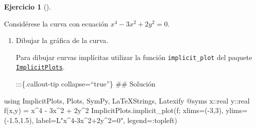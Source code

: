 \documentclass[
  a4paper,
]{scrreport}
\newenvironment{Shaded}{\begin{snugshade}}{\end{snugshade}}
\newcommand{\BuiltInTok}[1]{\textcolor[rgb]{0.00,0.23,0.31}{#1}}
\newcommand{\DataTypeTok}[1]{\textcolor[rgb]{0.68,0.00,0.00}{#1}}
\newcommand{\FloatTok}[1]{\textcolor[rgb]{0.68,0.00,0.00}{#1}}
\newcommand{\FunctionTok}[1]{\textcolor[rgb]{0.28,0.35,0.67}{#1}}
\newcommand{\ImportTok}[1]{\textcolor[rgb]{0.00,0.46,0.62}{#1}}
\newcommand{\NormalTok}[1]{\textcolor[rgb]{0.00,0.23,0.31}{#1}}
\newcommand{\OperatorTok}[1]{\textcolor[rgb]{0.37,0.37,0.37}{#1}}
\newcommand{\PreprocessorTok}[1]{\textcolor[rgb]{0.68,0.00,0.00}{#1}}
\newcommand{\StringTok}[1]{\textcolor[rgb]{0.13,0.47,0.30}{#1}}
\theoremstyle{definition}
\newtheorem{exercise}{Ejercicio}[chapter]
\theoremstyle{remark}
\begin{document}
\begin{exercise}[]\protect\hypertarget{exr-tangente-implicita}{}\label{exr-tangente-implicita}

Considérese la curva con ecuación \(x^4 - 3x^2 + 2y^2=0\).

\begin{enumerate}
\def\labelenumi{\alph{enumi}.}
\item
  Dibujar la gráfica de la curva.

  \begin{tcolorbox}[enhanced jigsaw, left=2mm, toprule=.15mm, toptitle=1mm, colback=white, opacitybacktitle=0.6, arc=.35mm, leftrule=.75mm, colbacktitle=quarto-callout-note-color!10!white, titlerule=0mm, title=\textcolor{quarto-callout-note-color}{\faInfo}\hspace{0.5em}{Ayuda}, bottomrule=.15mm, rightrule=.15mm, breakable, colframe=quarto-callout-note-color-frame, coltitle=black, bottomtitle=1mm, opacityback=0]

  Para dibujar curvas implícitas utilizar la función
  \texttt{implicit\_plot} del paquete
  \href{https://juliapackages.com/p/implicitplots}{\texttt{ImplicitPlots}}.

  \end{tcolorbox}

  :::\{.callout-tip collapse=``true''\} \#\# Solución
\end{enumerate}

\begin{Shaded}
\begin{Highlighting}[]
\ImportTok{using} \BuiltInTok{ImplicitPlots}\NormalTok{, }\BuiltInTok{Plots}\NormalTok{, }\BuiltInTok{SymPy}\NormalTok{, }\BuiltInTok{LaTeXStrings}\NormalTok{, }\BuiltInTok{Latexify}
\PreprocessorTok{@syms}\NormalTok{ x}\OperatorTok{::}\DataTypeTok{real }\NormalTok{y}\OperatorTok{::}\DataTypeTok{real}
\FunctionTok{f}\NormalTok{(x,y) }\OperatorTok{=}\NormalTok{ x}\OperatorTok{\^{}}\FloatTok{4} \OperatorTok{{-}} \FloatTok{3}\NormalTok{x}\OperatorTok{\^{}}\FloatTok{2} \OperatorTok{+} \FloatTok{2}\NormalTok{y}\OperatorTok{\^{}}\FloatTok{2}
\NormalTok{ImplicitPlots.}\FunctionTok{implicit\_plot}\NormalTok{(f; xlims}\OperatorTok{=}\NormalTok{(}\OperatorTok{{-}}\FloatTok{3}\NormalTok{,}\FloatTok{3}\NormalTok{), ylims}\OperatorTok{=}\NormalTok{(}\OperatorTok{{-}}\FloatTok{1.5}\NormalTok{,}\FloatTok{1.5}\NormalTok{), label}\OperatorTok{=}\NormalTok{L}\StringTok{"x\^{}4{-}3x\^{}2+2y\^{}2=0"}\NormalTok{, legend}\OperatorTok{=:}\NormalTok{topleft)}
\end{Highlighting}
\end{Shaded}


\end{exercise}
\end{document}
